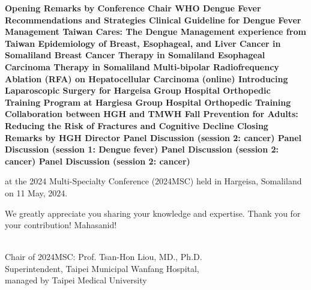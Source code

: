 \documentclass[a4paper, landscape]{article}
\newcommand{\topic}[1]{
\ifcase#1
\or Opening Remarks by Conference Chair
\or WHO Dengue Fever Recommendations and Strategies
\or Clinical Guideline for Dengue Fever Management
\or Taiwan Cares: The Dengue Management experience from Taiwan
\or Epidemiology of Breast, Esophageal, and Liver Cancer in Somaliland
\or Breast Cancer Therapy in Somaliland
\or Esophageal Carcinoma Therapy in Somaliland
\or Multi-bipolar Radiofrequency Ablation (RFA) on Hepatocellular Carcinoma (online)
\or Introducing Laparoscopic Surgery for Hargeisa Group Hospital
\or Orthopedic Training Program at Hargiesa Group Hospital
\or Orthopedic Training Collaboration between HGH and TMWH
\or Fall Prevention for Adults: Reducing the Risk of Fractures and Cognitive Decline
\or Closing Remarks by HGH Director
%
\or Panel Discussion (session 2: cancer)
\or Panel Discussion (session 1: Dengue fever)
\or Panel Discussion (session 2: cancer)
\or Panel Discussion (session 2: cancer)
\fi
}
\begin{document}
{\begin{center}
\begin{flushleft}
\textbf{\topic{\x}}

\vspace{0.5cm} 

at the 2024 Multi-Specialty Conference (2024MSC) held in Hargeisa, Somaliland on 11 May, 2024.


We greatly appreciate you sharing your knowledge and expertise. Thank you for your contribution! Mahasanid!

\end{flushleft}\\[0.5cm]



\large
Chair of 2024MSC: Prof. Tsan-Hon Liou, MD., Ph.D.\\
Superintendent, Taipei Municipal Wanfang Hospital, \\
managed by Taipei Medical University


\end{center}



\clearpage


} %




\end{document}
